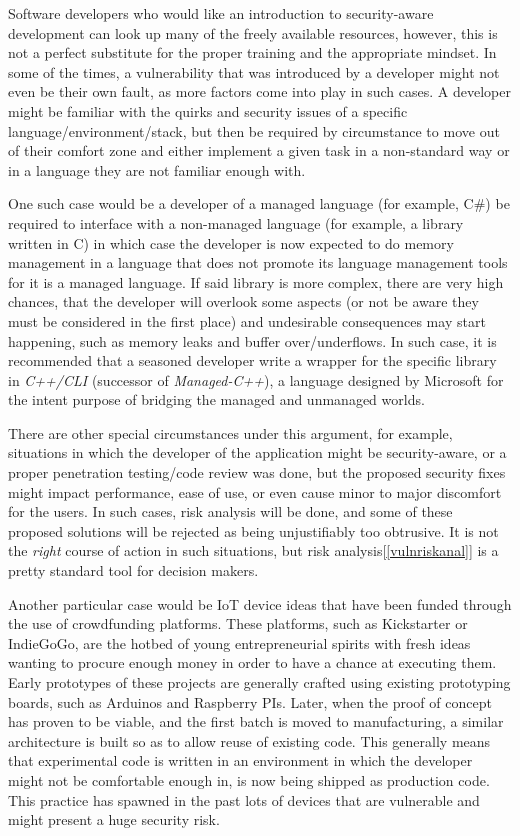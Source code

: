 \documentclass[a4paper,12pt]{article}
\begin{document}
	Software developers who would like an introduction to security-aware development can look up many of the freely available resources, however, this is not a perfect substitute for the proper training and the appropriate mindset. In some of the times, a vulnerability that was introduced by a developer might not even be their own fault, as more factors come into play in such cases. A developer might be familiar with the quirks and security issues of a specific language/environment/stack, but then be required by circumstance to move out of their comfort zone and either implement a given task in a non-standard way or in a language they are not familiar enough with.
	
	One such case would be a developer of a managed language (for example, C\#) be required to interface with a non-managed language (for example, a library written in C) in which case the developer is now expected to do memory management in a language that does not promote its language management tools for it is a managed language. If said library is more complex, there are very high chances, that the developer will overlook some aspects (or not be aware they must be considered in the first place) and undesirable consequences may start happening, such as memory leaks and buffer over/underflows. In such case, it is recommended that a seasoned developer write a wrapper for the specific library in \textit{C++/CLI} (successor of \textit{Managed-C++}), a language designed by Microsoft for the intent purpose\cite{hstutter06} of bridging the managed and unmanaged worlds.
	
	There are other special circumstances under this argument, for example, situations in which the developer of the application might be security-aware, or a proper penetration testing/code review was done, but the proposed security fixes might impact performance, ease of use, or even cause minor to major discomfort for the users. In such cases, risk analysis will be done, and some of these proposed solutions will be rejected as being unjustifiably too obtrusive. It is not the \textit{right} course of action in such situations, but risk analysis[\ref{vulnriskanal}] is a pretty standard tool for decision makers.
	
	Another particular case would be IoT device ideas that have been funded through the use of crowdfunding platforms. These platforms, such as Kickstarter or IndieGoGo, are the hotbed of young entrepreneurial spirits with fresh ideas wanting to procure enough money in order to have a chance at executing them. Early prototypes of these projects are generally crafted using existing prototyping boards, such as Arduinos and Raspberry PIs. Later, when the proof of concept has proven to be viable, and the first batch is moved to manufacturing, a similar architecture is built so as to allow reuse of existing code. This generally means that experimental code is written in an environment in which the developer might not be comfortable enough in, is now being shipped as production code. This practice has spawned in the past lots of devices that are vulnerable and might present a huge security risk.\cite{mstan14}
	
\end{document}
